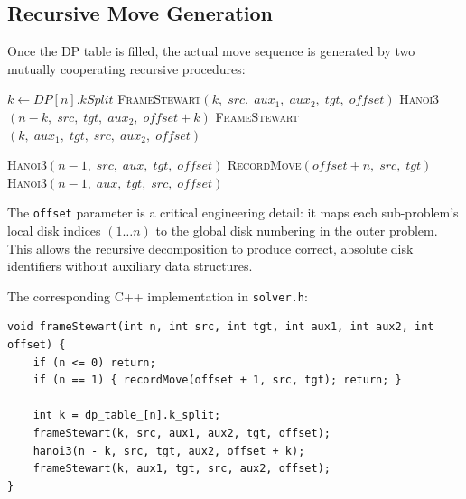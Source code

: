 \documentclass[12pt, a4paper]{article}
\begin{document}
\subsection{Recursive Move Generation}

Once the DP table is filled, the actual move sequence is generated by two mutually cooperating recursive procedures:

\begin{algorithm}[H]
$k \leftarrow \textit{DP}[n].\textit{kSplit}$\;
\textsc{FrameStewart}$(k,\; \textit{src},\; \textit{aux}_1,\; \textit{aux}_2,\; \textit{tgt},\; \textit{offset})$
\textsc{Hanoi3}$(n - k,\; \textit{src},\; \textit{tgt},\; \textit{aux}_2,\; \textit{offset} + k)$
\textsc{FrameStewart}$(k,\; \textit{aux}_1,\; \textit{tgt},\; \textit{src},\; \textit{aux}_2,\; \textit{offset})$
\caption{\textsc{FrameStewart}$(n, \textit{src}, \textit{tgt}, \textit{aux}_1, \textit{aux}_2, \textit{offset})$}
\label{alg:fs}
\end{algorithm}

\begin{algorithm}[H]
\textsc{Hanoi3}$(n - 1,\; \textit{src},\; \textit{aux},\; \textit{tgt},\; \textit{offset})$\;
\textsc{RecordMove}$(\textit{offset} + n,\; \textit{src},\; \textit{tgt})$\;
\textsc{Hanoi3}$(n - 1,\; \textit{aux},\; \textit{tgt},\; \textit{src},\; \textit{offset})$\;
\caption{\textsc{Hanoi3}$(n, \textit{src}, \textit{tgt}, \textit{aux}, \textit{offset})$}
\label{alg:h3}
\end{algorithm}

The \texttt{offset} parameter is a critical engineering detail: it maps each sub-problem's local disk indices $(1 \ldots n)$ to the global disk numbering in the outer problem.
This allows the recursive decomposition to produce correct, absolute disk identifiers without auxiliary data structures.

The corresponding C++ implementation in \texttt{solver.h}:

\begin{lstlisting}[style=cpp, caption={Recursive move generation (solver.h)}]
void frameStewart(int n, int src, int tgt, int aux1, int aux2, int offset) {
    if (n <= 0) return;
    if (n == 1) { recordMove(offset + 1, src, tgt); return; }

    int k = dp_table_[n].k_split;
    frameStewart(k, src, aux1, aux2, tgt, offset);
    hanoi3(n - k, src, tgt, aux2, offset + k);
    frameStewart(k, aux1, tgt, src, aux2, offset);
}
\end{lstlisting}
\end{document}

